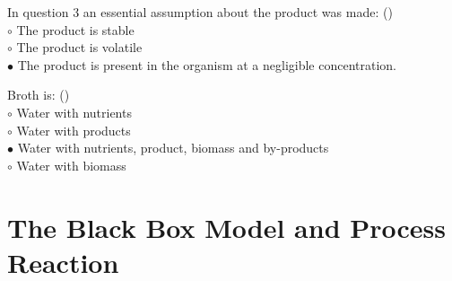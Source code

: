 \documentclass[]{beamer}
\begin{document}
\begin{frame}[shrink] {}
\addtocounter{questions}{1}
\color{blue}
In question 3 an essential assumption about the product was made: ()\\
\color{black}
\setlength{\parindent}{-0.4cm}
{\color{red}$\circ$}  The product is stable \\
{\color{red}$\circ$} The product is volatile \\
{\color{red}$\bullet$} The product is present in the organism at a negligible concentration.  \\
\end{frame}

\begin{frame}[shrink] {}
\addtocounter{questions}{1}
\color{blue}
Broth is: ()\\
\color{black}
\setlength{\parindent}{-0.4cm}
{\color{red}$\circ$}  Water with nutrients \\
{\color{red}$\circ$} Water with products \\
{\color{red}$\bullet$}  Water with nutrients, product, biomass and by-products \\
{\color{red}$\circ$} Water with biomass  \\
\end{frame}
\section{The Black Box Model and Process Reaction}
\end{document}
